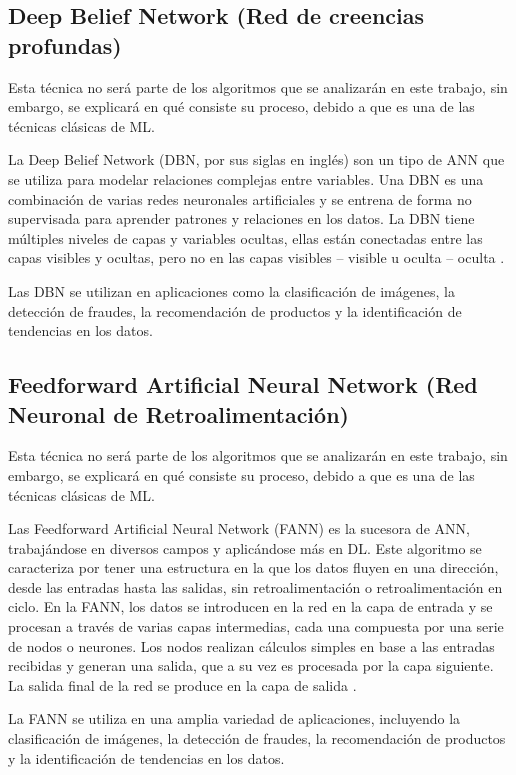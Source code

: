 \doublespacing
\subsection{Deep Belief Network (Red de creencias profundas)}
Esta técnica no será parte de los algoritmos que se analizarán en este trabajo, sin embargo, se explicará en qué consiste su proceso, debido a que es una de las técnicas clásicas de ML.\\
\par La Deep Belief Network (DBN, por sus siglas en inglés) son un tipo de ANN que se utiliza para modelar relaciones complejas entre variables. Una DBN es una combinación de varias redes neuronales artificiales y se entrena de forma no supervisada para aprender patrones y relaciones en los datos.  La DBN tiene múltiples niveles de capas y variables ocultas, ellas están conectadas entre las capas visibles y ocultas, pero no en las capas visibles – visible u oculta – oculta \cite{PuertaBarrera2015}.\\
\par Las DBN se utilizan en aplicaciones como la clasificación de imágenes, la detección de fraudes, la recomendación de productos y la identificación de tendencias en los datos. \\

\doublespacing
\subsection{Feedforward Artificial Neural Network (Red Neuronal de Retroalimentación)}
Esta técnica no será parte de los algoritmos que se analizarán en este trabajo, sin embargo, se explicará en qué consiste su proceso, debido a que es una de las técnicas clásicas de ML.\\
\par Las Feedforward Artificial Neural Network (FANN) es la sucesora de ANN, trabajándose en diversos campos y aplicándose más en DL. Este algoritmo se caracteriza por tener una estructura en la que los datos fluyen en una dirección, desde las entradas hasta las salidas, sin retroalimentación o retroalimentación en ciclo. En la FANN, los datos se introducen en la red en la capa de entrada y se procesan a través de varias capas intermedias, cada una compuesta por una serie de nodos o neurones. Los nodos realizan cálculos simples en base a las entradas recibidas y generan una salida, que a su vez es procesada por la capa siguiente. La salida final de la red se produce en la capa de salida \cite{salas2004redes}.\\ 
\par La FANN se utiliza en una amplia variedad de aplicaciones, incluyendo la clasificación de imágenes, la detección de fraudes, la recomendación de productos y la identificación de tendencias en los datos.\\

